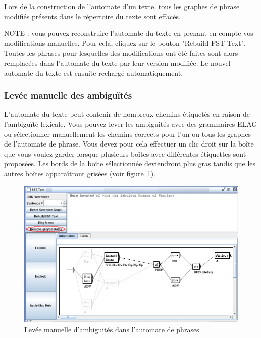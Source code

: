\bigskip
\noindent Lors de la construction de l’automate d’un texte, tous les graphes de phrase modifiés
présents dans le répertoire du texte sont effacés.


\bigskip
\noindent NOTE : vous pouvez reconstruire l’automate du texte en prenant en compte vos modifications 
manuelles. Pour cela, cliquez sur le bouton "Rebuild FST-Text". Toutes les phrases
pour lesquelles des modifications ont été faites sont alors remplacées dans l’automate du
texte par leur version modifiée. Le nouvel automate du texte est ensuite rechargé automatiquement.


\subsubsection{Levée manuelle des ambiguïtés}
L’automate du texte peut contenir de nombreux chemins étiquetés en raison de l'ambiguïté lexicale.
Vous pouvez lever les ambiguités avec des grammaires ELAG ou sélectionner manuellement les chemins
corrects pour l'un ou tous les graphes de l'automate de phrase. Vous devez pour cela effectuer un
clic droit sur la boîte que vous voulez garder lorsque plusieurs boîtes avec différentes étiquettes
sont proposées. Les bords de la boîte sélectionnée deviendront plus gras tandis que les autres
boîtes apparaîtront grisées (voir figure~\ref{fig-manually-resolve-ambiguities}).

\begin{figure}[!ht]
\begin{center}
\includegraphics[width=15cm]{resources/img/fig7-24b.png}
\caption{Levée manuelle d'ambiguités dans l'automate de
phrases\label{fig-manually-resolve-ambiguities}}
\end{center}
\end{figure} 

